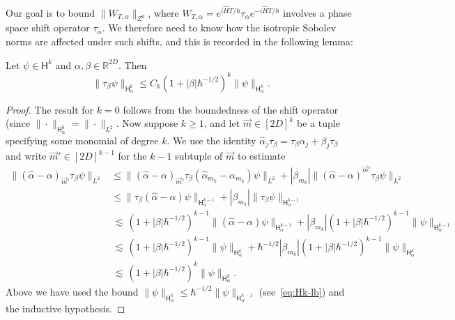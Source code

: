 \documentclass[11pt]{amsart}
\def\Sobolev{{\mathsf{H}}}
\def\Real{{\mathbb R}}
\def\lsim{{\,\lesssim\,}}
\numberwithin{equation}{section}
\begin{document}
Our goal is to bound $\|W_{T,\alpha}\|_{Z^k}$, where $W_{T,\alpha} = e^{i\hat{H}T/\hbar} \tau_\alpha e^{-i\hat{H}T/\hbar}$ involves a phase space shift operator $\tau_\alpha$.  We therefore need to know how the isotropic Sobolev norms are affected under such shifts, and this is recorded in the following lemma:
\begin{lemma}
\label{lem:sobolev-shift}
Let $\psi\in \Sobolev^k$ and $\alpha,\beta\in\Real^{2D}$.  Then
\[
\|\tau_\beta\psi\|_{\Sobolev^k_\alpha} \leq C_k (1 + |\beta|\hbar^{-1/2})^k \|\psi\|_{\Sobolev^k_\alpha}.
\]
\end{lemma}
\begin{proof}
The result for $k=0$ follows from the boundedness of the shift operator
(since $\|\cdot\|_{\Sobolev^0_\alpha} = \|\cdot\|_{L^2}$.  Now suppose $k\geq 1$, and let $\vec{m}\in [2D]^k$ be a tuple
specifying some monomial of degree $k$.
We use the identity $\hat{\alpha}_j \tau_\beta = \tau_\beta \hat{\alpha}_j + \beta_j \tau_\beta$
and write $\vec{m}'\in[2D]^{k-1}$ for the $k-1$ subtuple of $\vec{m}$
to estimate
\begin{align*}
\| (\hat{\alpha}-\alpha)_{\vec{m}'} \tau_\beta \psi\|_{L^2}
&\leq
\|(\hat{\alpha}-\alpha)_{\vec{m}'} \tau_\beta (\hat{\alpha}_{m_k}-\alpha_{m_k})\psi\|_{L^2}
+ |\beta_{m_k}| \|(\hat{\alpha}-\alpha)^{\vec{m}'} \tau_\beta\psi\|_{L^2} \\
&\leq \|\tau_\beta(\hat{\alpha}-\alpha) \psi\|_{\Sobolev^{k-1}_\alpha}
+  |\beta_{m_k}| \|\tau_\beta \psi\|_{\Sobolev^{k-1}_\alpha} \\
&\lsim (1+ |\beta|\hbar^{-1/2})^{k-1} \|(\hat{\alpha}-\alpha)\psi\|_{\Sobolev^{k-1}_\alpha}
+  |\beta_{m_k}| ( 1 + |\beta|\hbar^{-1/2})^{k-1} \|\psi\|_{\Sobolev^{k-1}_\alpha} \\
&\lsim (1+ |\beta|\hbar^{-1/2})^{k-1} \|\psi\|_{\Sobolev^{k}_\alpha}
+  \hbar^{-1/2}|\beta_{m_k}| ( 1 + |\beta|\hbar^{-1/2})^{k-1} \|\psi\|_{\Sobolev^{k}_\alpha} \\
&\lsim (1 + |\beta| \hbar^{-1/2})^k \|\psi\|_{\Sobolev^k_\alpha}.
\end{align*}
Above we have used the bound $\|\psi\|_{\Sobolev^k_\alpha} \leq \hbar^{-1/2} \|\psi\|_{\Sobolev^{k-1}_\alpha}$
(see~\eqref{eq:Hk-lb}) and the inductive hypothesis.
\end{proof}
\end{document}
